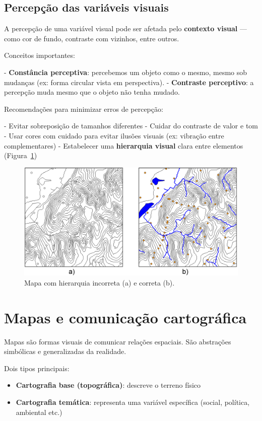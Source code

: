 \subsection{Percepção das variáveis visuais}

A percepção de uma variável visual pode ser afetada pelo \textbf{contexto visual} — como cor de fundo, contraste com vizinhos, entre outros.

Conceitos importantes:

- \textbf{Constância perceptiva}: percebemos um objeto como o mesmo, mesmo sob mudanças (ex: forma circular vista em perspectiva).
- \textbf{Contraste perceptivo}: a percepção muda mesmo que o objeto não tenha mudado.

Recomendações para minimizar erros de percepção:

- Evitar sobreposição de tamanhos diferentes
- Cuidar do contraste de valor e tom
- Usar cores com cuidado para evitar ilusões visuais (ex: vibração entre complementares)
- Estabelecer uma \textbf{hierarquia visual} clara entre elementos (Figura~\ref{Fig:JerarquiaMapa})

\begin{figure}[!hbt]
\centering
\includegraphics[width=\columnwidth]{Visualizacao/JerarquiaMapa.png}
\caption{\small Mapa com hierarquia incorreta (a) e correta (b).}
\label{Fig:JerarquiaMapa} 
\end{figure}

\section{Mapas e comunicação cartográfica}

Mapas são formas visuais de comunicar relações espaciais. São abstrações simbólicas e generalizadas da realidade.

Dois tipos principais:

\begin{itemize}
 \item \textbf{Cartografia base (topográfica)}: descreve o terreno físico
 \item \textbf{Cartografia temática}: representa uma variável específica (social, política, ambiental etc.)
\end{itemize}

